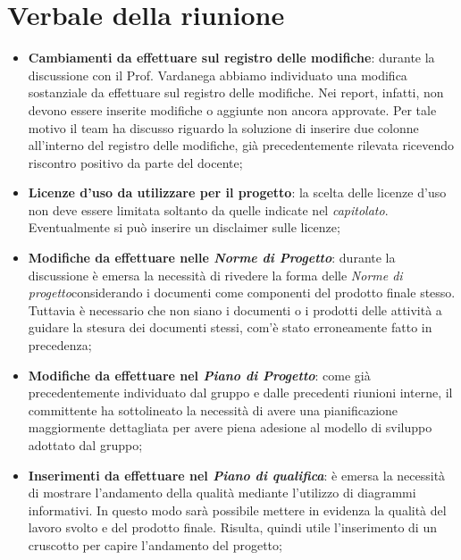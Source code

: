 \section{Verbale della riunione}
	\begin{itemize}
		\item \textbf{Cambiamenti da effettuare sul registro delle modifiche}: durante la discussione con il Prof. Vardanega abbiamo individuato una modifica sostanziale da effettuare sul registro delle modifiche. Nei report, infatti, non devono essere inserite modifiche o aggiunte non ancora approvate. Per tale motivo il team ha discusso riguardo la soluzione di inserire due colonne all'interno del registro delle modifiche, già precedentemente rilevata ricevendo riscontro positivo da parte del docente;%
		\item \textbf{Licenze d'uso da utilizzare per il progetto}: la scelta delle licenze d'uso non deve essere limitata soltanto da quelle indicate nel \textit{capitolato}\glos. Eventualmente si può inserire un disclaimer sulle licenze;
		\item \textbf{Modifiche da effettuare nelle \textit{Norme di Progetto}\docs}: durante la discussione è emersa la necessità di rivedere la forma delle \textit{Norme di progetto}\doc considerando i documenti come componenti del prodotto finale stesso. Tuttavia è necessario che non siano i documenti o i prodotti delle attività a guidare la stesura dei documenti stessi, com'è stato erroneamente fatto in precedenza;
		\item \textbf{Modifiche da effettuare nel \textit{Piano di Progetto}\docs}: come già precedentemente individuato dal gruppo e dalle precedenti riunioni interne, il committente ha sottolineato la necessità di avere una pianificazione maggiormente dettagliata per avere piena adesione al modello di sviluppo adottato dal gruppo;
		\item \textbf{Inserimenti da effettuare nel \textit{Piano di qualifica}\docs}: è emersa la necessità di mostrare l'andamento della qualità mediante l'utilizzo di diagrammi informativi. In questo modo sarà possibile mettere in evidenza la qualità del lavoro svolto e del prodotto finale. Risulta, quindi utile l'inserimento di un cruscotto per capire l'andamento del progetto;
	\end{itemize}